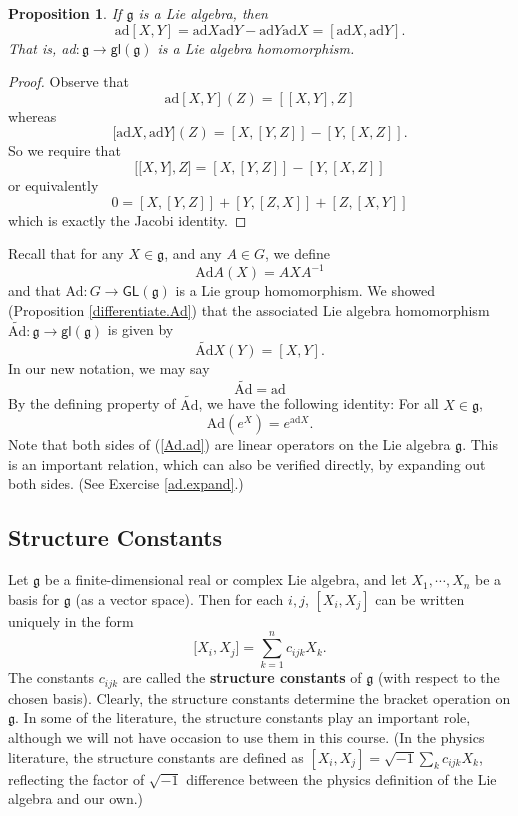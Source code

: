 \documentclass{amsbook}
\let \frak = \mathfrak
\theoremstyle{plain}
\newtheorem{proposition}[theorem]{Proposition}
\numberwithin{equation}{chapter}
\numberwithin{theorem}{chapter}
\begin{document}
\begin{proposition}
\label{ad.homo}If $\frak{g}$ is a Lie algebra, then
\[
\mathrm{ad}[X,Y]=\mathrm{ad}X\mathrm{ad}Y-\mathrm{ad}Y\mathrm{ad}%
X=[\mathrm{ad}X,\mathrm{ad}Y]\text{.}%
\]
That is, \textrm{ad}$:\frak{g}\rightarrow\mathsf{gl}(\frak{g})$ is a Lie
algebra homomorphism.
\end{proposition}

\begin{proof}
Observe that
\[
\mathrm{ad}[X,Y](Z)=[[X,Y],Z]
\]
whereas
\[
\lbrack\mathrm{ad}X,\mathrm{ad}Y](Z)=[X,[Y,Z]]-[Y,[X,Z]]\text{.}%
\]
So we require that
\[
\lbrack\lbrack X,Y],Z]=[X,[Y,Z]]-[Y,[X,Z]]
\]
or equivalently
\[
0=[X,[Y,Z]]+[Y,[Z,X]]+[Z,[X,Y]]
\]
which is exactly the Jacobi identity.
\end{proof}

Recall that for any $X\in\frak{g}$, and any $A\in G$, we define
\[
\mathrm{Ad}A(X)=AXA^{-1}%
\]
and that \textrm{Ad}$:G\rightarrow\mathsf{GL}(\frak{g})$ is a Lie group
homomorphism. We showed (Proposition \ref{differentiate.Ad}) that the
associated Lie algebra homomorphism $\widetilde{\mathrm{Ad}}:\frak{g}%
\rightarrow\mathsf{gl}(\frak{g})$ is given by
\[
\widetilde{\mathrm{Ad}}X(Y)=[X,Y]\text{.}%
\]
In our new notation, we may say
\[
\widetilde{\mathrm{Ad}}=\mathrm{ad}%
\]
By the defining property of $\widetilde{\mathrm{Ad}}$, we have the following
identity: For all $X\in\frak{g}$,
\begin{equation}
\mathrm{Ad}(e^{X})=e^{\mathrm{ad}X}\text{.}\label{Ad.ad}%
\end{equation}
Note that both sides of (\ref{Ad.ad}) are linear operators on the Lie algebra
$\frak{g}$. This is an important relation, which can also be verified
directly, by expanding out both sides. (See Exercise \ref{ad.expand}.)

\subsection{Structure Constants}

Let $\frak{g}$ be a finite-dimensional real or complex Lie algebra, and let
$X_{1},\cdots,X_{n}$ be a basis for $\frak{g}$ (as a vector space). Then for
each $i,j$, $[X_{i},X_{j}]$ can be written uniquely in the form
\[
\lbrack X_{i},X_{j}]=\sum_{k=1}^{n}c_{ijk}X_{k}\text{.}%
\]
The constants $c_{ijk}$ are called the \textbf{structure constants} of
$\frak{g}$ (with respect to the chosen basis). Clearly, the structure
constants determine the bracket operation on $\frak{g}$. In some of the
literature, the structure constants play an important role, although we will
not have occasion to use them in this course. (In the physics literature, the
structure constants are defined as $[X_{i},X_{j}]=\sqrt{-1}\sum_{k}%
c_{ijk}X_{k}$, reflecting the factor of $\sqrt{-1}$ difference between the
physics definition of the Lie algebra and our own.)
\end{document}
